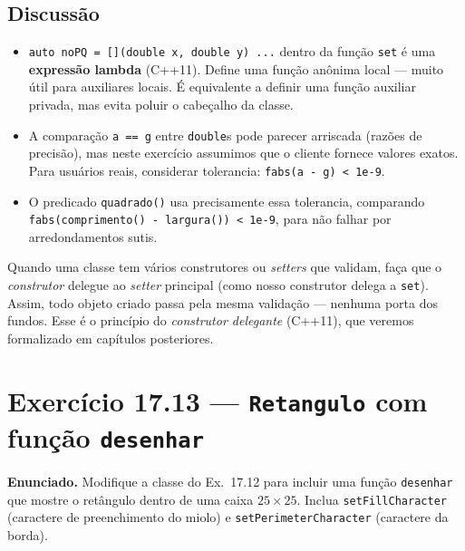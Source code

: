 \documentclass[11pt,a4paper]{article}
\begin{document}
\subsection*{Discuss\~ao}

\begin{itemize}[leftmargin=*]
  \item \texttt{auto noPQ = [](double x, double y) {...}} dentro da fun\c{c}\~ao \texttt{set} \'e uma \textbf{express\~ao lambda} (C++11). Define uma fun\c{c}\~ao an\^onima local --- muito \'util para auxiliares locais. \'E equivalente a definir uma fun\c{c}\~ao auxiliar privada, mas evita poluir o cabe\c{c}alho da classe.
  \item A compara\c{c}\~ao \texttt{a == g} entre \texttt{double}s pode parecer arriscada (raz\~oes de precis\~ao), mas neste exerc\'icio assumimos que o cliente fornece valores exatos. Para usu\'arios reais, considerar tolerancia: \texttt{fabs(a - g) < 1e-9}.
  \item O predicado \texttt{quadrado()} usa precisamente essa tolerancia, comparando \texttt{fabs(comprimento() - largura()) < 1e-9}, para n\~ao falhar por arredondamentos sutis.
\end{itemize}

\begin{boaprat}
Quando uma classe tem v\'arios construtores ou \emph{setters} que validam, fa\c{c}a que o \emph{construtor} delegue ao \emph{setter} principal (como nosso construtor delega a \texttt{set}). Assim, todo objeto criado passa pela mesma valida\c{c}\~ao --- nenhuma porta dos fundos. Esse \'e o princ\'ipio do \emph{construtor delegante} (C++11), que veremos formalizado em cap\'itulos posteriores.
\end{boaprat}

\newpage
\section{Exerc\'icio 17.13 --- \texttt{Retangulo} com fun\c{c}\~ao \texttt{desenhar}}

\begin{enunciado}
\textbf{Enunciado.} Modifique a classe do Ex.~17.12 para incluir uma fun\c{c}\~ao \texttt{desenhar} que mostre o ret\^angulo dentro de uma caixa $25\times 25$. Inclua \texttt{setFillCharacter} (caractere de preenchimento do miolo) e \texttt{setPerimeterCharacter} (caractere da borda).
\end{enunciado}
\end{document}
